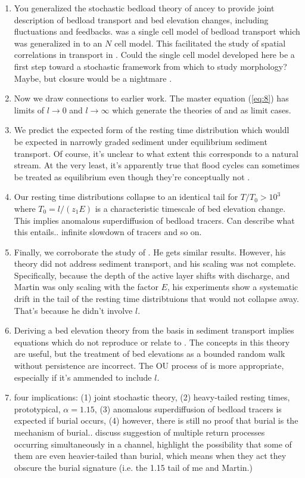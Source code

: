 \documentclass[draft]{agujournal2018}
\begin{document}
\begin{enumerate}
	\item You generalized the stochastic bedload theory of ancey to provide joint description of bedload transport and bed elevation changes, including fluctuations and feedbacks. \citet{Ancey2008} was a single cell model of bedload transport which was generalized in \citet{Ancey2014a} to an $N$ cell model. This facilitated the study of spatial correlations in transport in \citet{Heyman2014}. Could the single cell model developed here be a first step toward a stochastic framework from which to study morphology? 
	Maybe, but closure would be a nightmare \citep[e.g.][]{Heyman2016}.
	
	
	\item Now we draw connections to earlier work. The master equation (\ref{eq:8}) has limits of $l\rightarrow 0$ and $l \rightarrow \infty$ which generate the theories of \citet{Martin2014} and \citet{Ancey2008} as limit cases.
	\item We predict the expected form of the resting time distribution which wouldl be expected in narrowly graded sediment under equilibrium sediment transport. Of course, it's unclear to what extent this corresponds to a natural stream. At the very least, it's apparently true that flood cycles can sometimes be treated as equilibrium even though they're conceptually not \citep[e.g.][]{Phillips2013}.
	\item Our resting time distributions collapse to an identical tail for $T/T_0>10^3$ where $T_0 = l/(z_1 E)$ is a characteristic timescale of bed elevation change.
	This implies anomalous superdiffusion of bedload tracers. Can describe what this entails.. infinite slowdown of tracers and so on.
	\item Finally, we corroborate the study of \citet{Martin2014}.
	He gets similar results. However, his theory did not address sediment transport, and his scaling was not complete. Specifically, because the depth of the active layer shifts with discharge, and Martin was only scaling with the factor $E$, his experiments show a systematic drift in the tail of the resting time distribtuions that would not collapse away. That's because he didn't involve $l$. 
	\item Deriving a bed elevation theory from the basis in sediment transport implies equations which do not reproduce or relate to \citet{Voepel2013}. The concepts in this theory are useful, but the treatment of bed elevations as a bounded random walk without persistence are incorrect. The OU process of \citet{Martin2014} is more appropriate, especially if it's ammended to include $l$. 
	\item four implications: (1) joint stochastic theory, (2) heavy-tailed resting times, prototypical, $\alpha = 1.15$, (3) anomalous superdiffusion of bedload tracers is expected if burial occurs, (4) however, there is still no proof that burial is the mechanism of burial.. discuss \citet{Bradley2017} suggestion of multiple return processes occurring simultaneously in a channel, highlight the possibility that some of them are even heavier-tailed than burial, which means when they act they obscure the burial signature (i.e. the 1.15 tail of me and Martin.)
\end{enumerate}
\end{document}
